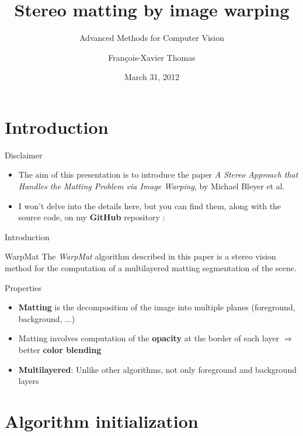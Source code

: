 \documentclass[12pt]{beamer}
\title[Stereo matting]{Stereo matting by image warping}
\subtitle{Advanced Methods for Computer Vision}
\author{François-Xavier Thomas}
\institute{ENS Cachan}
\date{March 31, 2012}
\begin{document}
\begin{frame}
\titlepage
\end{frame}

\section{Introduction}

\begin{frame}{Disclaimer}
  \begin{itemize}
    \item The aim of this presentation is to introduce the paper \emph{A Stereo Approach that Handles the Matting Problem via Image Warping}, by Michael Bleyer et al.
    \item I won't delve into the details here, but you can find them, along with the source code, on my \textbf{GitHub} repository :
  \end{itemize}
\end{frame}

\begin{frame}{Introduction}
  \begin{block}{WarpMat}
    The \emph{WarpMat} algorithm described in this paper is a stereo vision method for the computation of a multilayered matting segmentation of the scene.
  \end{block}

  \begin{block}{Properties}
    \begin{itemize}
      \item \textbf{Matting} is the decomposition of the image into multiple planes (foreground, background, ...)
      \item Matting involves computation of the \textbf{opacity} at the border of each layer $\Rightarrow$ better \textbf{color blending}
      \item \textbf{Multilayered}: Unlike other algorithms, not only foreground and background layers
    \end{itemize}
  \end{block}
\end{frame}

\section{Algorithm initialization}
\end{document}
